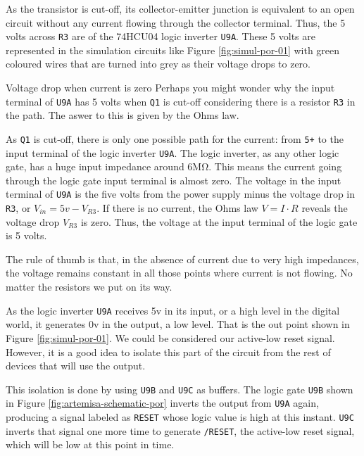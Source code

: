 As the transistor is cut-off, its collector-emitter junction is equivalent to an open circuit without any current flowing through the collector terminal. Thus, the 5 volts across {\tt R3} are  of the 74HCU04 logic inverter {\tt U9A}. These 5 volts are represented in the simulation circuits like Figure \ref{fig:simul-por-01} with green coloured wires that are turned into grey as their voltage drops to zero.

\begin{theory}{Voltage drop when current is zero}
  Perhaps you might wonder why the input terminal of {\tt U9A} has 5 volts when {\tt Q1} is cut-off considering there is a resistor {\tt R3} in the path. The aswer to this is given by the Ohms law.

  As {\tt Q1} is cut-off, there is only one possible path for the current: from {\tt 5+} to the input terminal of the logic inverter {\tt U9A}. The logic inverter, as any other logic gate, has a huge input impedance around 6M\si{\ohm}. This means the current going through the logic gate input terminal is almost zero. The voltage in the input terminal of {\tt U9A} is the five volts from the power supply minus the voltage drop in {\tt R3}, or $V_{in} = 5v - V_{R3}$. If there is no current, the Ohms law $V=I \cdot R$ reveals the voltage drop $V_{R3}$ is zero. Thus, the voltage at the input terminal of the logic gate is 5 volts.

  The rule of thumb is that, in the absence of current due to very high impedances, the voltage remains constant in all those points where current is not flowing. No matter the resistors we put on its way.
\end{theory}

As the logic inverter {\tt U9A} receives 5v in its input, or a high level in the digital world, it generates 0v in the output, a low level. That is the out point shown in Figure \ref{fig:simul-por-01}. We could be considered our active-low reset signal. However, it is a good idea to isolate this part of the circuit from the rest of devices that will use the output.

This isolation is done by using {\tt U9B} and {\tt U9C} as buffers. The logic gate {\tt U9B} shown in Figure \ref{fig:artemisa-schematic-por} inverts the output from {\tt U9A}  again, producing a signal labeled as {\tt RESET} whose logic value is high at this instant. {\tt U9C} inverts that signal one more time to generate {\tt /RESET}, the active-low reset signal, which will be low at this point in time.

